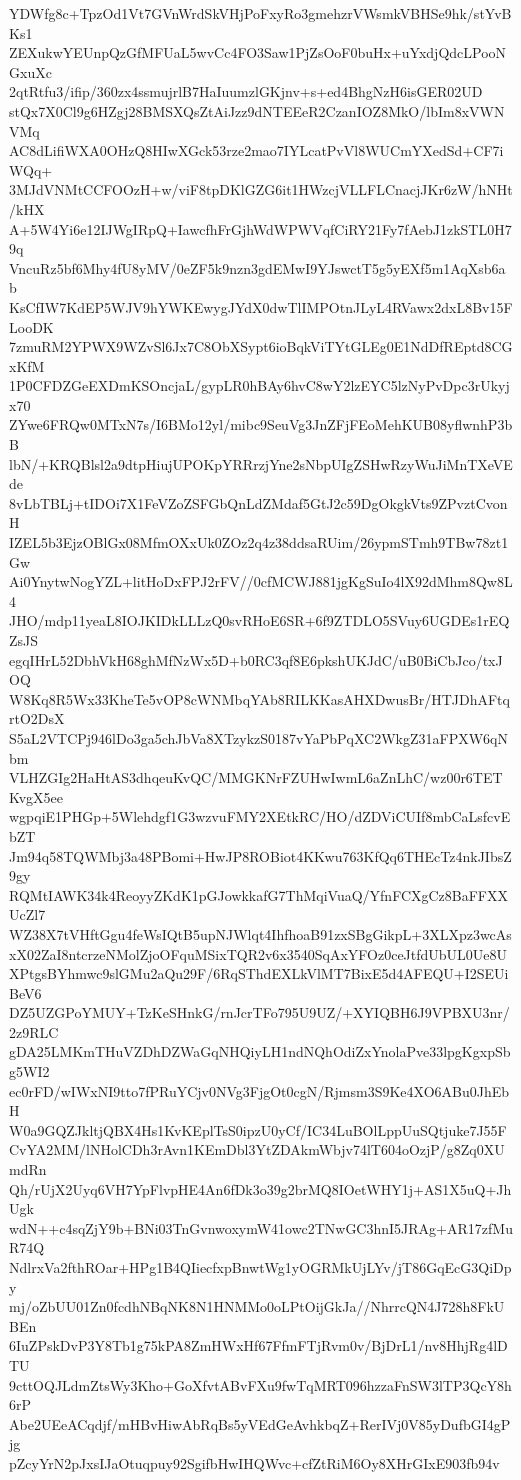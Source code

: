 YDWfg8c+TpzOd1Vt7GVnWrdSkVHjPoFxyRo3gmehzrVWsmkVBHSe9hk/stYvBKs1
ZEXukwYEUnpQzGfMFUaL5wvCc4FO3Saw1PjZsOoF0buHx+uYxdjQdcLPooNGxuXc
2qtRtfu3/ifip/360zx4ssmujrlB7HaIuumzlGKjnv+s+ed4BhgNzH6isGER02UD
stQx7X0Cl9g6HZgj28BMSXQsZtAiJzz9dNTEEeR2CzanIOZ8MkO/lbIm8xVWNVMq
AC8dLifiWXA0OHzQ8HIwXGck53rze2mao7IYLcatPvVl8WUCmYXedSd+CF7iWQq+
3MJdVNMtCCFOOzH+w/viF8tpDKlGZG6it1HWzcjVLLFLCnacjJKr6zW/hNHt/kHX
A+5W4Yi6e12IJWgIRpQ+IawcfhFrGjhWdWPWVqfCiRY21Fy7fAebJ1zkSTL0H79q
VncuRz5bf6Mhy4fU8yMV/0eZF5k9nzn3gdEMwI9YJswctT5g5yEXf5m1AqXsb6ab
KsCfIW7KdEP5WJV9hYWKEwygJYdX0dwTlIMPOtnJLyL4RVawx2dxL8Bv15FLooDK
7zmuRM2YPWX9WZvSl6Jx7C8ObXSypt6ioBqkViTYtGLEg0E1NdDfREptd8CGxKfM
1P0CFDZGeEXDmKSOncjaL/gypLR0hBAy6hvC8wY2lzEYC5lzNyPvDpc3rUkyjx70
ZYwe6FRQw0MTxN7s/I6BMo12yl/mibc9SeuVg3JnZFjFEoMehKUB08yflwnhP3bB
lbN/+KRQBlsl2a9dtpHiujUPOKpYRRrzjYne2sNbpUIgZSHwRzyWuJiMnTXeVEde
8vLbTBLj+tIDOi7X1FeVZoZSFGbQnLdZMdaf5GtJ2c59DgOkgkVts9ZPvztCvonH
IZEL5b3EjzOBlGx08MfmOXxUk0ZOz2q4z38ddsaRUim/26ypmSTmh9TBw78zt1Gw
Ai0YnytwNogYZL+litHoDxFPJ2rFV//0cfMCWJ881jgKgSuIo4lX92dMhm8Qw8L4
JHO/mdp11yeaL8IOJKIDkLLLzQ0svRHoE6SR+6f9ZTDLO5SVuy6UGDEs1rEQZsJS
egqIHrL52DbhVkH68ghMfNzWx5D+b0RC3qf8E6pkshUKJdC/uB0BiCbJco/txJOQ
W8Kq8R5Wx33KheTe5vOP8cWNMbqYAb8RILKKasAHXDwusBr/HTJDhAFtqrtO2DsX
S5aL2VTCPj946lDo3ga5chJbVa8XTzykzS0187vYaPbPqXC2WkgZ31aFPXW6qNbm
VLHZGIg2HaHtAS3dhqeuKvQC/MMGKNrFZUHwIwmL6aZnLhC/wz00r6TETKvgX5ee
wgpqiE1PHGp+5Wlehdgf1G3wzvuFMY2XEtkRC/HO/dZDViCUIf8mbCaLsfcvEbZT
Jm94q58TQWMbj3a48PBomi+HwJP8ROBiot4KKwu763KfQq6THEcTz4nkJIbsZ9gy
RQMtIAWK34k4ReoyyZKdK1pGJowkkafG7ThMqiVuaQ/YfnFCXgCz8BaFFXXUcZl7
WZ38X7tVHftGgu4feWsIQtB5upNJWlqt4IhfhoaB91zxSBgGikpL+3XLXpz3wcAs
xX02ZaI8ntcrzeNMolZjoOFquMSixTQR2v6x3540SqAxYFOz0ceJtfdUbUL0Ue8U
XPtgsBYhmwc9slGMu2aQu29F/6RqSThdEXLkVlMT7BixE5d4AFEQU+I2SEUiBeV6
DZ5UZGPoYMUY+TzKeSHnkG/rnJcrTFo795U9UZ/+XYIQBH6J9VPBXU3nr/2z9RLC
gDA25LMKmTHuVZDhDZWaGqNHQiyLH1ndNQhOdiZxYnolaPve33lpgKgxpSbg5WI2
ec0rFD/wIWxNI9tto7fPRuYCjv0NVg3FjgOt0cgN/Rjmsm3S9Ke4XO6ABu0JhEbH
W0a9GQZJkltjQBX4Hs1KvKEplTsS0ipzU0yCf/IC34LuBOlLppUuSQtjuke7J55F
CvYA2MM/lNHolCDh3rAvn1KEmDbl3YtZDAkmWbjv74lT604oOzjP/g8Zq0XUmdRn
Qh/rUjX2Uyq6VH7YpFlvpHE4An6fDk3o39g2brMQ8IOetWHY1j+AS1X5uQ+JhUgk
wdN++c4sqZjY9b+BNi03TnGvnwoxymW41owc2TNwGC3hnI5JRAg+AR17zfMuR74Q
NdlrxVa2fthROar+HPg1B4QIiecfxpBnwtWg1yOGRMkUjLYv/jT86GqEcG3QiDpy
mj/oZbUU01Zn0fcdhNBqNK8N1HNMMo0oLPtOijGkJa//NhrrcQN4J728h8FkUBEn
6IuZPskDvP3Y8Tb1g75kPA8ZmHWxHf67FfmFTjRvm0v/BjDrL1/nv8HhjRg4lDTU
9cttOQJLdmZtsWy3Kho+GoXfvtABvFXu9fwTqMRT096hzzaFnSW3lTP3QcY8h6rP
Abe2UEeACqdjf/mHBvHiwAbRqBs5yVEdGeAvhkbqZ+RerIVj0V85yDufbGI4gPjg
pZcyYrN2pJxsIJaOtuqpuy92SgifbHwIHQWvc+cfZtRiM6Oy8XHrGIxE903fb94v

